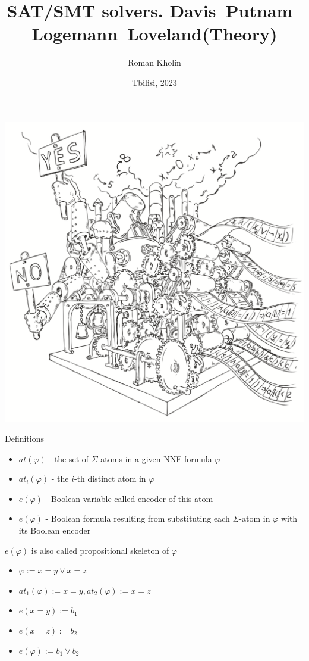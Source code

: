\documentclass{beamer}
\begin{document}
\title{SAT/SMT solvers. Davis–Putnam–Logemann–Loveland(Theory)}
\author{Roman Kholin}
\date{Tbilisi, 2023}

\begin{frame}
\includegraphics[scale=0.5]{../decision-procedure.png}
\end{frame}

\frame{\titlepage}

\begin{frame}{Definitions}
\begin{block}{}
\begin{itemize}
\item $at(\varphi)$ - the set of $\Sigma$-atoms in a given NNF formula $\varphi$
\item $at_i(\varphi)$ - the $i$-th distinct atom in $\varphi$
\item $e(\varphi)$ - Boolean variable called encoder of this atom
\item $e(\varphi)$ - Boolean formula resulting from substituting each $\Sigma$-atom in $\varphi$ with its Boolean encoder
\end{itemize}
$e(\varphi)$ is also called propositional skeleton of $\varphi$
\end{block}
\begin{itemize}
\item $\varphi := x = y \vee x = z$
\item $at_1(\varphi) := x = y, at_2(\varphi) := x = z$
\item $e(x = y) := b_1$
\item $e(x = z) := b_2$
\item $e(\varphi) := b_1 \vee b_2$
\end{itemize}
\end{frame}
\end{document}
